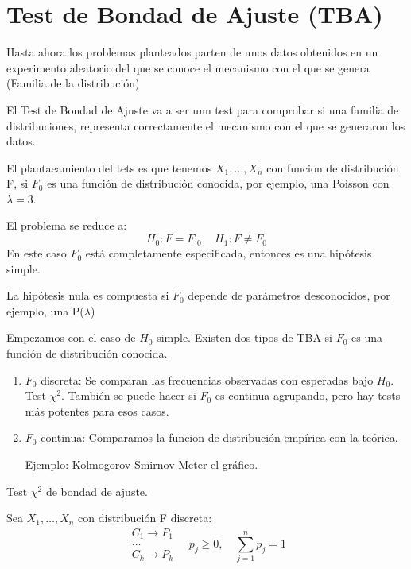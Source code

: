 \section{Test de Bondad de Ajuste (TBA)}

Hasta ahora los problemas planteados parten de unos datos obtenidos
en un experimento aleatorio del que se conoce el mecanismo con el que se genera (Familia de la distribución)

El Test de Bondad de Ajuste va a ser unn test para comprobar si una familia de distribuciones, representa correctamente el mecanismo con el que se generaron los datos.


El plantaeamiento del tets es que tenemos $X_1,\dots,X_n$ con funcion de distribución F, si $F_0$ es una función de distribución conocida, por ejemplo, una Poisson con $\lambda=3$.

El problema se reduce a:
$$H_0: F=F:_0 \quad H_1: F \neq F_0$$
En este caso $F_0$ está completamente especificada, entonces es una hipótesis simple.

La hipótesis nula es compuesta si $F_0$ depende de parámetros desconocidos, por ejemplo, una P($\lambda$)

Empezamos con el caso de $H_0$ simple. Existen dos tipos de TBA si $F_0$ es una función de  distribución conocida.
\begin{enumerate}
    \item $F_0$ discreta: Se comparan las frecuencias observadas con esperadas bajo $H_0$. Test $\chi^2$. También se puede hacer si $F_0$ es continua agrupando, pero hay tests más potentes para esos casos.
    \item $F_0$ continua: Comparamos la funcion de distribución empírica con la teórica.
    
    Ejemplo: Kolmogorov-Smirnov
    Meter el gráfico.
    
    
\end{enumerate}

Test $\chi^2$ de bondad de ajuste.

Sea $X_1,\dots,X_n$ con distribución F discreta:
\[
\begin{matrix}
    C_1 \to P_1\\
    \dots \\
    C_k \to P_k
\end{matrix}
\quad
p_j \geq 0,
\quad \sum_{j=1}^{n} p_j=1
\]

